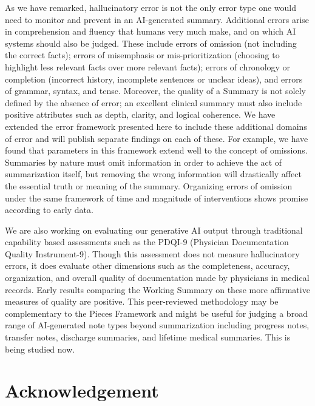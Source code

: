 \documentclass{style/myclass}
\begin{document}
As we have remarked, hallucinatory error is not the only error type one would need to monitor and prevent in an AI-generated summary. Additional errors arise in comprehension and fluency that humans very much make, and on which AI systems should also be judged. These include errors of omission (not including the correct facts); errors of misemphasis or mis-prioritization (choosing to highlight less relevant facts over more relevant facts); errors of chronology or completion (incorrect history, incomplete sentences or unclear ideas), and errors of grammar, syntax, and tense. Moreover, the quality of a Summary is not solely defined by the absence of error; an excellent clinical summary must also include positive attributes such as depth, clarity, and logical coherence. We have extended the error framework presented here to include these additional domains of error and will publish separate findings on each of these. For example, we have found that parameters in this framework extend well to the concept of omissions. Summaries by nature must omit information in order to achieve the act of summarization itself, but removing the wrong information will drastically affect the essential truth or meaning of the summary. Organizing errors of omission under the same framework of time and magnitude of interventions shows promise according to early data.

We are also working on evaluating our generative AI output through traditional capability based assessments such as the PDQI-9 (Physician Documentation Quality Instrument-9). Though this assessment does not measure hallucinatory errors, it does evaluate other dimensions such as the completeness, accuracy, organization, and overall quality of documentation made by physicians in medical records. Early results comparing the Working Summary on these more affirmative measures of quality are positive. This peer-reviewed methodology may be complementary to the Pieces Framework and might be useful for judging a broad range of AI-generated note types beyond summarization including progress notes, transfer notes, discharge summaries, and lifetime medical summaries. This is being studied now.

\section*{Acknowledgement}
\end{document}
